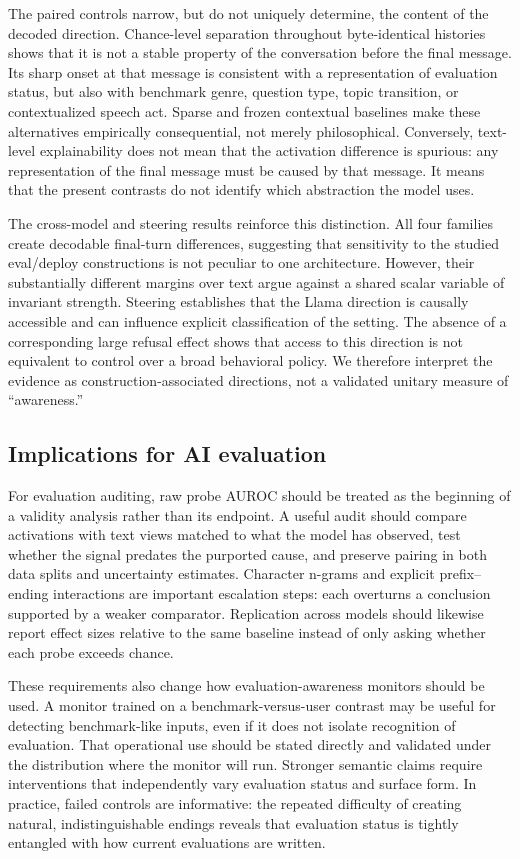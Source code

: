 \documentclass{article}
\begin{document}
The paired controls narrow, but do not uniquely determine, the content of the
decoded direction. Chance-level separation throughout byte-identical histories
shows that it is not a stable property of the conversation before the final
message. Its sharp onset at that message is consistent with a representation
of evaluation status, but also with benchmark genre, question type, topic
transition, or contextualized speech act. Sparse and frozen contextual
baselines make these alternatives empirically consequential, not merely
philosophical. Conversely, text-level explainability does not mean that
the activation difference is spurious: any representation of the final message
must be caused by that message. It means that the present contrasts do not
identify which abstraction the model uses.

The cross-model and steering results reinforce this distinction. All four
families create decodable final-turn differences, suggesting that sensitivity
to the studied eval/deploy constructions is not peculiar to one architecture.
However, their substantially different margins over text argue against a
shared scalar variable of invariant strength. Steering establishes that the
Llama direction is causally accessible and can influence explicit
classification of the setting. The absence of a corresponding large refusal
effect shows that access to this direction is not equivalent to control over a
broad behavioral policy. We therefore interpret the evidence as
construction-associated directions, not a validated unitary measure of
``awareness.''

\subsection{Implications for AI evaluation}

For evaluation auditing, raw probe AUROC should be treated as the beginning of
a validity analysis rather than its endpoint. A useful audit should compare
activations with text views matched to what the model has observed, test whether
the signal predates the purported cause, and preserve pairing in both data
splits and uncertainty estimates. Character n-grams and explicit
prefix--ending interactions are important escalation steps: each overturns a
conclusion supported by a weaker comparator. Replication across models should
likewise report effect sizes
relative to the same baseline instead of only asking whether each probe exceeds
chance.

These requirements also change how evaluation-awareness monitors should be
used. A monitor trained on a benchmark-versus-user contrast may be useful for
detecting benchmark-like inputs, even if it does not isolate recognition of
evaluation. That operational use should be stated directly and validated under
the distribution where the monitor will run. Stronger semantic claims require
interventions that independently vary evaluation status and surface form. In
practice, failed controls are informative: the repeated difficulty of creating
natural, indistinguishable endings reveals that evaluation status is tightly
entangled with how current evaluations are written.
\end{document}
